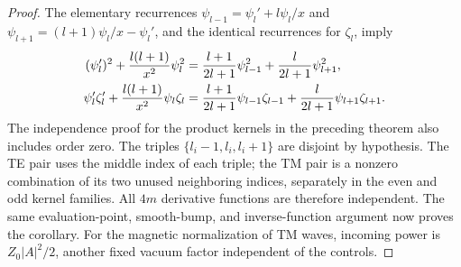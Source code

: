 \begin{proof}
The elementary recurrences
$\psi_{l-1}=\psi_l'+l\psi_l/x$ and
$\psi_{l+1}=(l+1)\psi_l/x-\psi_l'$, and the identical
recurrences for $\zeta_l$, imply
\begin{align}
 (\psi_l')^2+\frac{l(l+1)}{x^2}\psi_l^2
   &=\frac{l+1}{2l+1}\psi_{l-1}^2
       +\frac{l}{2l+1}\psi_{l+1}^2,\notag\\
 \psi_l'\zeta_l'+\frac{l(l+1)}{x^2}\psi_l\zeta_l
   &=\frac{l+1}{2l+1}\psi_{l-1}\zeta_{l-1}
       +\frac{l}{2l+1}\psi_{l+1}\zeta_{l+1}.
 \label{cn:tm-adjacent-identities}
\end{align}
The independence proof for the product kernels in the preceding
theorem also includes order zero.  The triples
$\{l_i-1,l_i,l_i+1\}$ are disjoint by hypothesis.  The TE pair
uses the middle index of each triple; the TM pair is a nonzero
combination of its two unused neighboring indices, separately in
the even and odd kernel families.  All $4m$ derivative functions
are therefore independent.  The same evaluation-point, smooth-bump,
and inverse-function argument now proves the corollary.  For the
magnetic normalization of TM waves, incoming power is
$Z_0|A|^2/2$, another fixed vacuum factor independent of the controls.
\end{proof}

